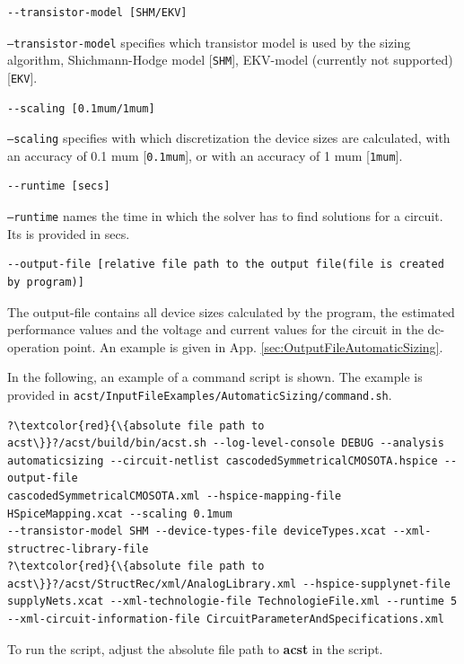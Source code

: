 \begin{lstlisting}[basicstyle=\ttfamily\scriptsize,backgroundcolor={\color{gray!30}}, escapechar=? ]
--transistor-model [SHM/EKV] 
\end{lstlisting}
{\tt --transistor-model} specifies which transistor model is used by the sizing algorithm, Shichmann-Hodge model [{\tt SHM}], EKV-model (currently not supported) [{\tt EKV}].

\begin{lstlisting}[basicstyle=\ttfamily\scriptsize,backgroundcolor={\color{gray!30}}, escapechar=? ]
--scaling [0.1mum/1mum] 
\end{lstlisting}
{\tt --scaling} specifies with which discretization the device sizes are calculated, with an accuracy of 0.1 mum [{\tt 0.1mum}], or with an accuracy of 1 mum [{\tt 1mum}].

\begin{lstlisting}[basicstyle=\ttfamily\scriptsize,backgroundcolor={\color{gray!30}}, escapechar=? ]
--runtime [secs] 
\end{lstlisting}
{\tt --runtime} names the time in which the solver has to find solutions for a circuit. Its is provided in secs.


\begin{lstlisting}[basicstyle=\ttfamily\scriptsize,backgroundcolor={\color{gray!30}}, escapechar=? ]
--output-file [relative file path to the output file(file is created by program)] 
\end{lstlisting}
The output-file contains all device sizes calculated by the program, the estimated performance values and the voltage and current values for the circuit in the dc-operation point. An example is given in App. \ref{sec:OutputFileAutomaticSizing}.

In the following, an example of a command script is shown. The example is provided in {\tt acst/InputFileExamples/AutomaticSizing/command.sh}.
\begin{lstlisting}[basicstyle=\ttfamily\scriptsize,backgroundcolor={\color{gray!30}}, escapechar=? ]
?\textcolor{red}{\{absolute file path to acst\}}?/acst/build/bin/acst.sh --log-level-console DEBUG --analysis 
automaticsizing --circuit-netlist cascodedSymmetricalCMOSOTA.hspice --output-file 
cascodedSymmetricalCMOSOTA.xml --hspice-mapping-file HSpiceMapping.xcat --scaling 0.1mum
--transistor-model SHM --device-types-file deviceTypes.xcat --xml-structrec-library-file 
?\textcolor{red}{\{absolute file path to acst\}}?/acst/StructRec/xml/AnalogLibrary.xml --hspice-supplynet-file
supplyNets.xcat --xml-technologie-file TechnologieFile.xml --runtime 5
--xml-circuit-information-file CircuitParameterAndSpecifications.xml 
\end{lstlisting}
To run the script, adjust the absolute file path to {\bf acst} in the script.

